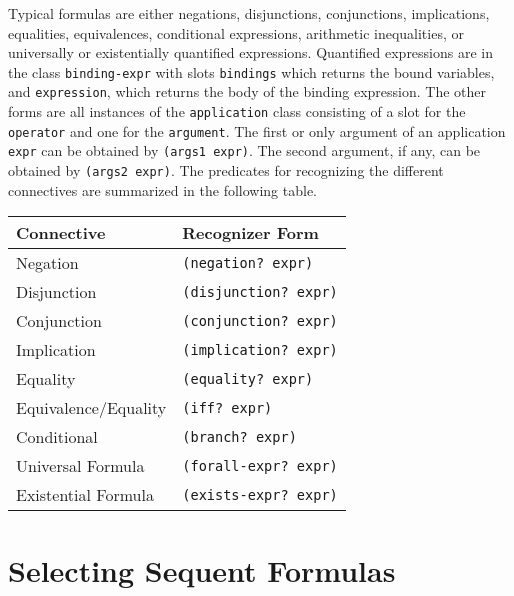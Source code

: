 \documentclass[12pt,twoside]{book}
\begin{document}
Typical formulas are either negations, disjunctions, conjunctions,
implications, equalities, equivalences, conditional expressions,
arithmetic inequalities, or  universally or existentially
quantified expressions.  Quantified expressions are in the class 
\texttt{binding-expr} with slots \texttt{bindings} which returns the
bound variables, and \texttt{expression}, which returns the body of
the binding expression.  The other forms are all instances of
the \texttt{application} class consisting of a slot for the
\texttt{operator} and one for the \texttt{argument}.  The first or
only argument of an application \texttt{expr} can be obtained by
\texttt{(args1 expr)}\@.  The second argument, if any, can be obtained
by \texttt{(args2 expr)}\@.   The predicates for recognizing
the different connectives are summarized in the following table.
\begin{center}
\begin{tabular}{|l|l|}
\hline
{\bf Connective} & {\bf Recognizer Form}\\\hline
Negation & \texttt{(negation?\ expr)} \\\hline
Disjunction & \texttt{(disjunction?\ expr)} \\\hline
Conjunction & \texttt{(conjunction?\ expr)} \\\hline
Implication & \texttt{(implication?\ expr)} \\\hline
Equality & \texttt{(equality?\ expr)} \\\hline
Equivalence/Equality & \texttt{(iff?\ expr)} \\\hline
Conditional & \texttt{(branch?\ expr)} \\\hline
Universal Formula & \texttt{(forall-expr?\ expr)} \\\hline
Existential Formula & \texttt{(exists-expr?\ expr)} \\\hline
\end{tabular}
\end{center}


\section{Selecting Sequent Formulas}\label{selection}
\end{document}
